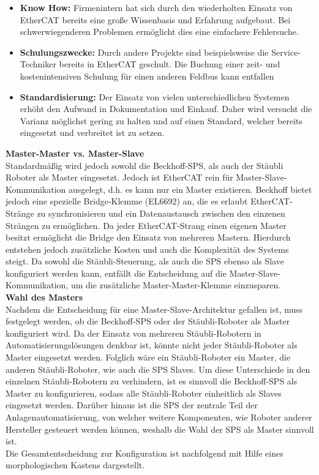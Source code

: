 \documentclass[ a4paper,
                oneside,
                toc=bibliography,
                toc=listof
                ]{scrbook}
\begin{document}
	\begin{itemize}
		\item \textbf{Know How: } Firmenintern hat sich durch den wiederholten Einsatz von EtherCAT bereits eine große Wissenbasis und Erfahrung aufgebaut. Bei schwerwiegenderen Problemen ermöglicht dies eine einfachere Fehlersuche.
		\item \textbf{Schulungszwecke: } Durch andere Projekte sind beispielsweise die Service-Techniker bereits in EtherCAT geschult. Die Buchung einer zeit- und kostenintensiven Schulung für einen anderen Feldbus kann entfallen
		\item \textbf{Standardisierung:} Der Einsatz von vielen unterschiedlichen Systemen erhöht den Aufwand in Dokumentation und Einkauf. Daher wird versucht die Varianz möglichst gering zu halten und auf einen Standard, welcher bereits eingesetzt und verbreitet ist zu setzen.\\
	\end{itemize}
	\textbf{Master-Master vs. Master-Slave}\\
	Standardmäßig wird jedoch sowohl die Beckhoff-SPS, als auch der Stäubli Roboter als Master eingesetzt. Jedoch ist EtherCAT rein für Master-Slave-Kommunikation ausgelegt, d.h. es kann nur ein Master existieren. \cite{ethercat}	Beckhoff bietet jedoch eine spezielle Bridge-Klemme (EL6692) an, die es erlaubt EtherCAT-Stränge zu synchronisieren und ein Datenaustausch zwischen den einzenen Strängen zu ermöglichen. Da jeder EtherCAT-Strang einen eigenen Master besitzt ermöglicht die Bridge den Einsatz von mehreren Mastern. \cite{Bridge} Hierdurch entstehen jedoch zusätzliche Kosten und auch die Komplexität des Systems steigt. Da sowohl die Stäubli-Steuerung, als auch die SPS ebenso als Slave konfiguriert werden kann, entfällt die Entscheidung auf die Master-Slave-Kommunikation, um die zusätzliche Master-Master-Klemme einzusparen.\\
	\textbf{Wahl des Masters} \\
	Nachdem die Entscheidung für eine Master-Slave-Architektur gefallen ist, muss festgelegt werden, ob die Beckhoff-SPS oder der Stäubli-Roboter als Master konfiguriert wird. Da der Einsatz von mehreren Stäubli-Robotern in Automatisierungslösungen denkbar ist, könnte nicht jeder Stäubli-Roboter als Master eingesetzt werden. Folglich wäre ein Stäubli-Roboter ein Master, die anderen Stäubli-Roboter, wie auch die SPS Slaves. Um diese Unterschiede in den einzelnen Stäubli-Robotern zu verhindern, ist es sinnvoll die Beckhoff-SPS als Master zu konfigurieren, sodass alle Stäubli-Roboter einheitlich als Slaves eingesetzt werden. Darüber hinaus ist die SPS der zentrale Teil der Anlagenautomatisierung, von welcher weitere Komponenten, wie Roboter anderer Hersteller gesteuert werden können, weshalb die Wahl der SPS als Master sinnvoll ist.\\
	Die Gesamtentscheidung zur Konfiguration ist nachfolgend mit Hilfe eines morphologischen Kastens dargestellt.\\
	
\end{document}
